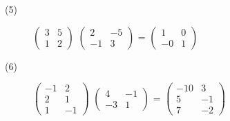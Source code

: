 \documentclass{jsarticle}
\begin{document}
\begin{description}
		\item[(5)]
			$ \begin{pmatrix}
				3 & 5 \\
				1 & 2
			\end{pmatrix} $
			$ \begin{pmatrix}
				2 & -5 \\
				-1 & 3
			\end{pmatrix} $
			=
			$ \begin{pmatrix}
				1 & 0 \\
				-0 & 1
			\end{pmatrix} $

		\item[(6)]
			$ \begin{pmatrix}
				-1 & 2 \\
				2 & 1 \\
				1 & -1
			\end{pmatrix} $
			$ \begin{pmatrix}
				4 & -1 \\
				-3 & 1
			\end{pmatrix} $
			=
			$ \begin{pmatrix}
				-10 & 3 \\
				5 & -1 \\
				7 & -2
			\end{pmatrix} $
	\end{description}
\end{document}
